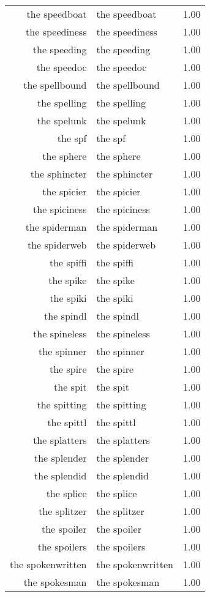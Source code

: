 \begin{table}[ht]
\begin{tabular}{rlr}
  the speedboat & the speedboat & 1.00 \\ 
  the speediness & the speediness & 1.00 \\ 
  the speeding & the speeding & 1.00 \\ 
  the speedoc & the speedoc & 1.00 \\ 
  the spellbound & the spellbound & 1.00 \\ 
  the spelling & the spelling & 1.00 \\ 
  the spelunk & the spelunk & 1.00 \\ 
  the spf & the spf & 1.00 \\ 
  the sphere & the sphere & 1.00 \\ 
  the sphincter & the sphincter & 1.00 \\ 
  the spicier & the spicier & 1.00 \\ 
  the spiciness & the spiciness & 1.00 \\ 
  the spiderman & the spiderman & 1.00 \\ 
  the spiderweb & the spiderweb & 1.00 \\ 
  the spiffi & the spiffi & 1.00 \\ 
  the spike & the spike & 1.00 \\ 
  the spiki & the spiki & 1.00 \\ 
  the spindl & the spindl & 1.00 \\ 
  the spineless & the spineless & 1.00 \\ 
  the spinner & the spinner & 1.00 \\ 
  the spire & the spire & 1.00 \\ 
  the spit & the spit & 1.00 \\ 
  the spitting & the spitting & 1.00 \\ 
  the spittl & the spittl & 1.00 \\ 
  the splatters & the splatters & 1.00 \\ 
  the splender & the splender & 1.00 \\ 
  the splendid & the splendid & 1.00 \\ 
  the splice & the splice & 1.00 \\ 
  the splitzer & the splitzer & 1.00 \\ 
  the spoiler & the spoiler & 1.00 \\ 
  the spoilers & the spoilers & 1.00 \\ 
  the spokenwritten & the spokenwritten & 1.00 \\ 
  the spokesman & the spokesman & 1.00 \\ 

\end{tabular}
\end{table}
